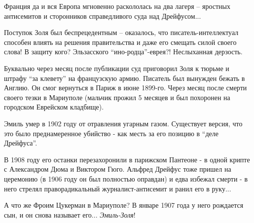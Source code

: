 Франция да и вся Европа мгновенно раскололась на два лагеря – яростных
антисемитов и сторонников справедливого суда над Дрейфусом...

Поступок Золя был беспрецедентным – оказалось, что писатель-интеллектуал
способен влиять на решения правительства и даже его смещать силой своего слова!
В защиту кого? Эльзасского \enquote{ино\hyp{}родца}-еврея?! Неслыханная дерзость.

Буквально через месяц после публикации суд приговорил Золя к тюрьме и штрафу
\enquote{за клевету} на французскую армию. Писатель был вынужден бежать в
Англию. Он смог вернуться в Париж в июне 1899-го. Через месяц после смерти
своего тезки в Мариуполе (мальчик прожил 5 месяцев и был похоронен на городском
Еврейском кладбище).

Эмиль умер в 1902 году от отравления угарным газом. Существует версия, что это
было преднамеренное убийство - как месть за его позицию в \enquote{деле
Дрейфуса}.

В 1908 году его останки перезахоронили в парижском Пантеоне - в одной крипте с
Александром Дюма и Виктором Гюго. Альфред Дрейфус тоже пришел на церемонию (в
1906 году он был полностью оправдан) и едва избежал смерти - в него стрелял
праворадикальный журналист-антисемит и ранил его в руку...

А что же Фроим Цукерман в Мариуполе? В январе 1907 года у него рождается сын, и
он снова называет его... \emph{Эмиль-Золя}!
